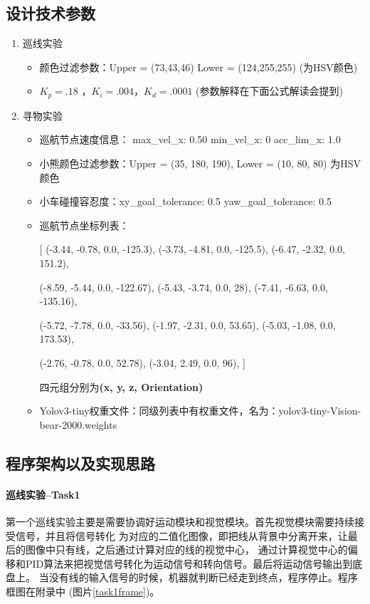 \documentclass[a4paper,twoside]{article}
\begin{document}
\subsection{设计技术参数}
\begin{enumerate}
	\item 巡线实验
	      \begin{itemize}
		      \item 颜色过滤参数：Upper = (73,43,46) Lower = (124,255,255) (为HSV颜色)
		      \item $K_p = .18$ ，$K_i = .004$，$K_d = .0001$ (参数解释在下面公式解读会提到)
	      \end{itemize}
	\item 寻物实验
	      \begin{itemize}
		      \item 巡航节点速度信息：  max\_vel\_x: 0.50
		            min\_vel\_x: 0
		            acc\_lim\_x: 1.0
		      \item 小熊颜色过滤参数：Upper = (35, 180, 190), Lower = (10, 80, 80) 为HSV颜色
		      \item 小车碰撞容忍度：xy\_goal\_tolerance: 0.5 \quad yaw\_goal\_tolerance: 0.5
		      \item 巡航节点坐标列表：

		            [
		            (-3.44, -0.78, 0.0, -125.3),
		            (-3.73, -4.81, 0.0, -125.5),
		            (-6.47, -2.32, 0.0, 151.2),


		            (-8.59, -5.44, 0.0, -122.67),
		            (-5.43, -3.74, 0.0, 28),
		            (-7.41, -6.63, 0.0, -135.16),


		            (-5.72, -7.78, 0.0, -33.56),
		            (-1.97, -2.31, 0.0, 53.65),
		            (-5.03, -1.08, 0.0, 173.53),


		            (-2.76, -0.78, 0.0, 52.78),
		            (-3.04, 2.49, 0.0, 96),
		            ]

		            四元组分别为\textbf{(x, y, z, Orientation)}
		      \item Yolov3-tiny权重文件：同级列表中有权重文件，名为：yolov3-tiny-Vision-bear-2000.weights
	      \end{itemize}
\end{enumerate}
\subsection{程序架构以及实现思路}
\paragraph{巡线实验--Task1}
第一个巡线实验主要是需要协调好运动模块和视觉模块。首先视觉模块需要持续接受信号，并且将信号转化
为对应的二值化图像，即把线从背景中分离开来，让最后的图像中只有线，之后通过计算对应的线的视觉中心，
通过计算视觉中心的偏移和PID算法来把视觉信号转化为运动信号和转向信号。最后将运动信号输出到底盘上。
当没有线的输入信号的时候，机器就判断已经走到终点，程序停止。程序框图在附录中 (图片\ref*{task1frame})。
\end{document}
